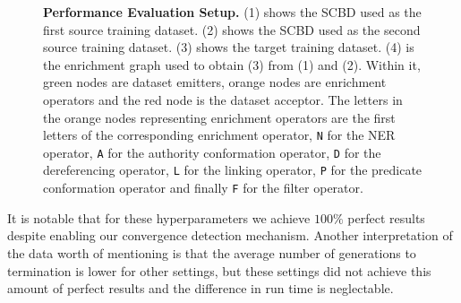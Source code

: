 \begin{figure}[!p]
\centering
{}%
\caption[Performance Evaluation Setup]{\textbf{Performance Evaluation Setup.} (1) shows the \ac{SCBD} used as the first source training dataset. (2) shows the \ac{SCBD} used as the second source training dataset. (3) shows the target training dataset. (4) is the enrichment graph used to obtain (3) from (1) and (2). Within it, green nodes are dataset emitters, orange nodes are enrichment operators and the red node is the dataset acceptor. The letters in the orange nodes representing enrichment operators are the first letters of the corresponding enrichment operator, \ie \texttt{N} for the \ac{NER} operator, \texttt{A} for the authority conformation operator, \texttt{D} for the dereferencing operator, \texttt{L} for the linking operator, \texttt{P} for the predicate conformation operator and finally  \texttt{F} for the filter operator.}
\label{fig:performanceeval}  
\end{figure}

It is notable that for these hyperparameters we achieve $100\%$ perfect results despite enabling our convergence detection mechanism.
Another interpretation of the data worth of mentioning is that the average number of generations to termination is lower for other settings, but these settings did not achieve this amount of perfect results and the difference in run time is neglectable.

